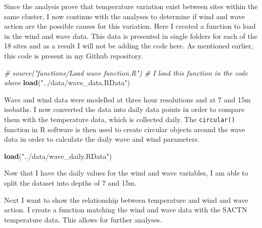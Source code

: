 \documentclass[10pt,A4,]{article}
\newenvironment{Shaded}{\begin{snugshade}}{\end{snugshade}}
\newcommand{\KeywordTok}[1]{\textcolor[rgb]{0.13,0.29,0.53}{\textbf{#1}}}
\newcommand{\StringTok}[1]{\textcolor[rgb]{0.31,0.60,0.02}{#1}}
\newcommand{\CommentTok}[1]{\textcolor[rgb]{0.56,0.35,0.01}{\textit{#1}}}
\newcommand{\OperatorTok}[1]{\textcolor[rgb]{0.81,0.36,0.00}{\textbf{#1}}}
\newcommand{\NormalTok}[1]{#1}
\begin{document}
Since the analysis prove that temperature variation exist between sites
within the same cluster, I now continue with the analyses to determine
if wind and wave action are the possible causes for this variation. Here
I created a function to load in the wind and wave data. This data is
presented in single folders for each of the 18 sites and as a result I
will not be adding the code here. As mentioned earlier, this code is
present in my Github repository.

\begin{Shaded}
\begin{Highlighting}[]
\CommentTok{# source("functions/Load wave function.R") # I load this function in the code above}
\KeywordTok{load}\NormalTok{(}\StringTok{"../data/wave_data.RData"}\NormalTok{)}
\end{Highlighting}
\end{Shaded}

Wave and wind data were modelled at three hour resolutions and at 7 and
15m isobaths. I now converted the data into daily data points in order
to compare them with the temperature data, which is collected daily. The
\texttt{circular()} function in R software is then used to create
circular objects around the wave data in order to calculate the daily
wave and wind parameters.

\begin{Shaded}
\begin{Highlighting}[]
\KeywordTok{load}\NormalTok{(}\StringTok{"../data/wave_daily.RData"}\NormalTok{)}
\end{Highlighting}
\end{Shaded}

Now that I have the daily values for the wind and wave variables, I am
able to split the dataset into depths of 7 and 15m.

\begin{Shaded}
\end{Shaded}

Next I want to show the relationship between temperature and wind and
wave action. I create a function matching the wind and wave data with
the SACTN temperature data. This allows for further analyses.
\end{document}
